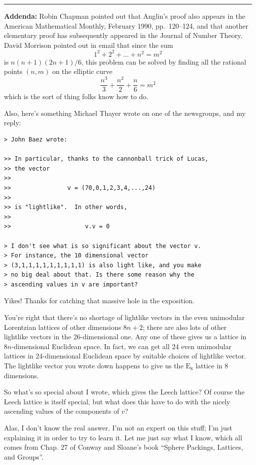 \documentclass{article}
\begin{document}
\begin{center}\rule{0.5\linewidth}{0.5pt}\end{center}

\textbf{Addenda:} Robin Chapman pointed out that Anglin's proof also
appears in the American Mathematical Monthly, February 1990,
pp.~120--124, and that another elementary proof has subsequently
appeared in the Journal of Number Theory. David Morrison pointed out in
email that since the sum \[1^2 + 2^2 + \ldots + n^2 = m^2\] is
\(n(n+1)(2n+1)/6\), this problem can be solved by finding all the
rational points \((n,m)\) on the elliptic curve
\[\frac{n^3}{3} + \frac{n^2}2 + \frac{n}{6} = m^2\] which is the sort of
thing folks know how to do.

Also, here's something Michael Thayer wrote on one of the newsgroups,
and my reply:

\begin{verbatim}
> John Baez wrote:

>> In particular, thanks to the cannonball trick of Lucas,
>> the vector
>>
>>                v = (70,0,1,2,3,4,...,24)
>>
>> is "lightlike".  In other words,
>>
>>                     v.v = 0

> I don't see what is so significant about the vector v.
> For instance, the 10 dimensional vector
> (3,1,1,1,1,1,1,1,1,1) is also light like, and you make
> no big deal about that. Is there some reason why the
> ascending values in v are important?
\end{verbatim}

Yikes! Thanks for catching that massive hole in the exposition.

You're right that there's no shortage of lightlike vectors in the even
unimodular Lorentzian lattices of other dimensions \(8n+2\); there are
also lots of other lightlike vectors in the 26-dimensional one. Any one
of these gives us a lattice in \(8n\)-dimensional Euclidean space. In
fact, we can get all 24 even unimodular lattices in 24-dimensional
Euclidean space by suitable choices of lightlike vector. The lightlike
vector you wrote down happens to give us the \(\mathrm{E}_8\) lattice in
8 dimensions.

So what's so special about I wrote, which gives the Leech lattice? Of
course the Leech lattice is itself special, but what does this have to
do with the nicely ascending values of the components of \(v\)?

Alas, I don't know the real answer. I'm not an expert on this stuff; I'm
just explaining it in order to try to learn it. Let me just say what I
know, which all comes from Chap. 27 of Conway and Sloane's book ``Sphere
Packings, Lattices, and Groups''.
\end{document}
